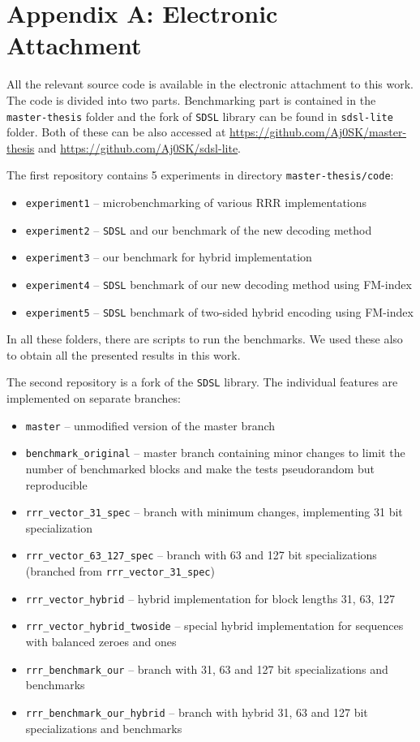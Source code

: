 \chapter*{Appendix A: Electronic Attachment}
\label{kap:kapAppendixA}

All the relevant source code is available in the electronic attachment to this work.
The code is divided into two parts. Benchmarking part is contained in the \verb!master-thesis!
folder and the fork of \texttt{SDSL} library can be found in \verb!sdsl-lite! folder.
Both of these can be also accessed at \url{https://github.com/Aj0SK/master-thesis} and
\url{https://github.com/Aj0SK/sdsl-lite}.

The first repository contains 5 experiments in directory \texttt{master-thesis/code}:
\begin{itemize}
    \item \texttt{experiment1} -- microbenchmarking of various RRR implementations
    \item \texttt{experiment2} -- \texttt{SDSL} and our benchmark of the new decoding method
    \item \texttt{experiment3} -- our benchmark for hybrid implementation
    \item \texttt{experiment4} -- \texttt{SDSL} benchmark of our new decoding method using FM-index
    \item \texttt{experiment5} -- \texttt{SDSL} benchmark of two-sided hybrid encoding using FM-index
\end{itemize}
In all these folders, there are scripts to run the benchmarks. We used these also to obtain
all the presented results in this work.

The second repository is a fork of the \texttt{SDSL} library. The individual features are implemented
on separate branches:
\begin{itemize}
    \item \texttt{master} -- unmodified version of the master branch
    \item \texttt{benchmark\_original} -- master branch containing minor changes
        to limit the number of benchmarked blocks and make the tests pseudorandom but reproducible
    \item \texttt{rrr\_vector\_31\_spec} -- branch with minimum changes, implementing 31 bit specialization
    \item \texttt{rrr\_vector\_63\_127\_spec} -- branch with 63 and 127 bit specializations (branched from \texttt{rrr\_vector\_31\_spec})
    \item \texttt{rrr\_vector\_hybrid} -- hybrid implementation for block lengths 31, 63, 127
    \item \texttt{rrr\_vector\_hybrid\_twoside} -- special hybrid implementation for sequences with balanced zeroes and ones
    \item \texttt{rrr\_benchmark\_our} -- branch with 31, 63 and 127 bit specializations and benchmarks
    \item \texttt{rrr\_benchmark\_our\_hybrid} -- branch with hybrid 31, 63 and 127 bit specializations and benchmarks
\end{itemize}

